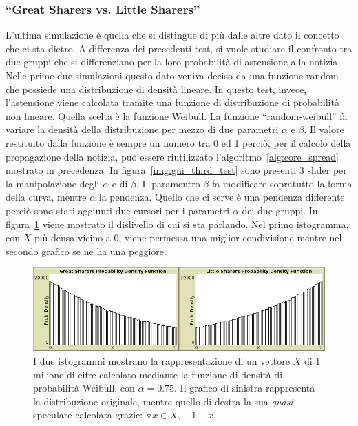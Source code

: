 \subsubsection{``Great Sharers vs. Little Sharers''}
\label{section:great_sharers_vs_little_sharers}

L'ultima simulazione è quella che si distingue di più dalle altre dato il concetto che ci sta dietro.
A differenza dei precedenti test, si vuole studiare il confronto tra due gruppi che si differenziano 
per la loro probabilità di astensione alla notizia. 
Nelle prime due simulazioni questo dato veniva deciso da una funzione random che possiede una distribuzione di
densità lineare.
In questo test, invece, l'astensione viene calcolata tramite una funzione di distribuzione di probabilità non lineare.
Quella scelta è la funzione Weibull\cite{biblio:weibull}.
La funzione ``random-weibull'' fa variare la densità della distribuzione per mezzo di due parametri $\alpha$ e $\beta$.
Il valore restituito dalla funzione è sempre un numero tra 0 ed 1 perciò, per il calcolo della propagazione della notizia,
può essere riutilizzato l'algoritmo~\ref{alg:core_spread} mostrato in precedenza.
In figura~\ref{img:gui_third_test} sono presenti 3 slider per la manipolazione degli $\alpha$ e di $\beta$. 
Il paramentro $\beta$ fa modificare sopratutto la forma della curva, mentre $\alpha$ la pendenza. 
Quello che ci serve è una pendenza differente perciò sono stati aggiunti due cursori per i parametri $\alpha$ dei due gruppi.
In figura~\ref{img:weibull_alpha_0_75} viene mostrato il dislivello di cui si sta parlando.
Nel primo istogramma, con $X$ più densa vicino a 0, viene permessa una miglior condivisione mentre nel secondo grafico se ne ha una peggiore.


\begin{figure}[!htb]
\centerline {
  \includegraphics[width=1.1\textwidth]{img/weibull-alpha-0.75.png}
}
\caption[caption for img/weibull-alpha-0.75.png]{I due istogrammi mostrano la rappresentazione di un vettore $X$ di 1 milione di cifre 
calcolato mediante la funzione di densità di probabilità Weibull, con $\alpha = 0.75$.
Il grafico di sinistra rappresenta la distribuzione originale, 
mentre quello di destra la sua \emph{quasi \protect\footnotemark} speculare calcolata grazie: $\forall x \in X, \quad 1 - x$.}
\label{img:weibull_alpha_0_75}
\end{figure}

